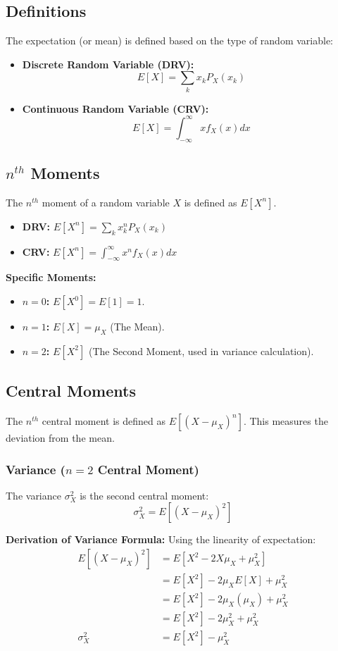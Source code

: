 \documentclass[11pt]{article}
\begin{document}
\subsection{Definitions}
The expectation (or mean) is defined based on the type of random variable:
\begin{itemize}
    \item \textbf{Discrete Random Variable (DRV):}
    $$ E[X] = \sum_{k} x_{k} P_{X}(x_{k}) $$
    \item \textbf{Continuous Random Variable (CRV):}
    $$ E[X] = \int_{-\infty}^{\infty} x f_{X}(x) dx $$
\end{itemize}

\subsection{$n^{th}$ Moments}
The $n^{th}$ moment of a random variable $X$ is defined as $E[X^n]$.
\begin{itemize}
    \item \textbf{DRV:} $E[X^n] = \sum_{k} x_{k}^{n} P_{X}(x_{k})$
    \item \textbf{CRV:} $E[X^n] = \int_{-\infty}^{\infty} x^{n} f_{X}(x) dx$
\end{itemize}

\textbf{Specific Moments:}
\begin{itemize}
    \item \textbf{$n=0$:} $E[X^0] = E[1] = 1$.
    \item \textbf{$n=1$:} $E[X] = \mu_X$ (The Mean).
    \item \textbf{$n=2$:} $E[X^2]$ (The Second Moment, used in variance calculation).
\end{itemize}

\subsection{Central Moments}
The $n^{th}$ central moment is defined as $E[(X - \mu_X)^n]$. This measures the deviation from the mean.

\subsubsection{Variance ($n=2$ Central Moment)}
The variance $\sigma_X^2$ is the second central moment:
$$ \sigma_{X}^{2} = E[(X - \mu_{X})^{2}] $$

\textbf{Derivation of Variance Formula:}
Using the linearity of expectation:
\begin{align*}
E[(X - \mu_{X})^{2}] &= E[X^2 - 2X\mu_X + \mu_X^2] \\
&= E[X^2] - 2\mu_X E[X] + \mu_X^2 \\
&= E[X^2] - 2\mu_X (\mu_X) + \mu_X^2 \\
&= E[X^2] - 2\mu_X^2 + \mu_X^2 \\
\sigma_{X}^{2} &= E[X^2] - \mu_X^2
\end{align*}
\end{document}
